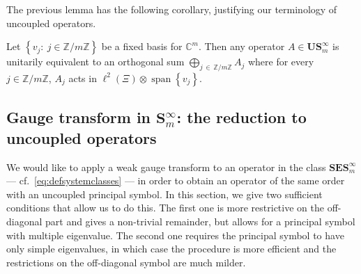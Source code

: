 \documentclass[10pt]{amsart}
\theoremstyle{definition}\newtheorem{defi}[theo]{Definition}\newtheorem{rema}[theo]{Remark}\newtheorem{exam}[theo]{Example}\newtheorem{nota}[theo]{Notation}
\DeclareMathOperator{\spann}{span}
\newcommand{\C}{\mathbb C}
\newcommand{\Z}{\mathbb Z}
\newcommand{\BE}{\mathbf E}
\newcommand{\BS}{\mathbf S}
\newcommand{\BU}{\mathbf U}
\newcommand{\set}[1]{\left\{ #1 \right\}}
\begin{document}
The previous lemma has the following corollary, justifying our terminology of uncoupled operators.
\begin{coro}
Let $\set{v_j:\ j\in\Z/m\Z}$ be a fixed basis for $\C^m$. Then any operator $A \in \BU\BS_m^\infty$ is unitarily equivalent to an orthogonal sum $\bigoplus_{j\,\in\,\Z/m\Z}A_j$ where for every $j\in\Z/m\Z$, $A_j$ acts in $\ell^2(\Xi) \otimes \spann\set{v_j}$.
\end{coro}


\subsection{Gauge transform in \texorpdfstring{$\BS_m^\infty$}{Sm}: the reduction to uncoupled operators} \label{sec:reducscalar}

We would like to apply a weak gauge transform to an operator in the class $\BS\BE\BS^\infty_m$\linebreak --- cf.~\eqref{eq:defsystemclasses} --- in order to obtain an operator of the same order with an uncoupled principal symbol. In this section, we give two sufficient conditions that allow us to do this. The first one is more restrictive on the off-diagonal part and gives a non-trivial remainder, but allows for a principal symbol with multiple eigenvalue. The second one requires the principal symbol to have only simple eigenvalues, in which case the procedure is more efficient and the restrictions on the off-diagonal symbol are much milder.
\end{document}

